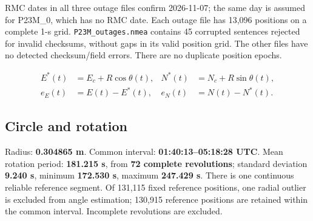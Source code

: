 \documentclass[11pt,a4paper]{article}
\numberwithin{equation}{section}
\numberwithin{figure}{section}
\begin{document}
RMC dates in all three outage files confirm 2026-11-07; the same day is assumed for P23M\_0, which has no RMC date. Each outage file has 13,096 positions on a complete 1-s grid. {\small\texttt{P23M\_\allowbreak{}outages.nmea}} contains 45 corrupted sentences rejected for invalid checksums, without gaps in its valid position grid. The other files have no detected checksum/\allowbreak{}field errors. There are no duplicate position epochs.

\begin{equation}\begin{aligned} E^*(t)&=E_c+R\cos\theta(t), & N^*(t)&=N_c+R\sin\theta(t),\\ e_E(t)&=E(t)-E^*(t), & e_N(t)&=N(t)-N^*(t).\end{aligned}\label{eq:en-circle}\end{equation}

\subsection{Circle and rotation}

Radius: \textbf{0.304865 m}. Common interval: \textbf{01:40:13–05:18:28 UTC}. Mean rotation period: \textbf{181.215 s}, from \textbf{72 complete revolutions}; standard deviation \textbf{9.240 s}, minimum \textbf{172.530 s}, maximum \textbf{247.429 s}. There is one continuous reliable reference segment. Of 131,115 fixed reference positions, one radial outlier is excluded from angle estimation; 130,915 reference positions are retained within the common interval. Incomplete revolutions are excluded.
\end{document}
